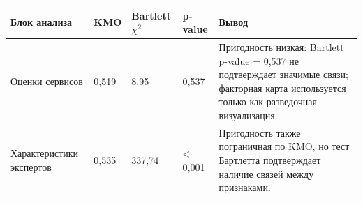 {%
\small
\setlength{\tabcolsep}{3.0pt}
\renewcommand{\arraystretch}{1.15}
\begin{adjustbox}{max width=\textwidth}
\begin{tabular}{L{4.2cm}C{1.7cm}C{2.2cm}C{1.6cm}L{5.2cm}}
\toprule
Блок анализа & KMO & Bartlett $\chi^2$ & p-value & Вывод \\
\midrule
Оценки сервисов & 0,519 & 8,95 & 0,537 & Пригодность низкая: Bartlett p-value = 0,537 не подтверждает значимые связи; факторная карта используется только как разведочная визуализация. \\
Характеристики экспертов & 0,535 & 337,74 & < 0,001 & Пригодность также пограничная по KMO, но тест Бартлетта подтверждает наличие связей между признаками. \\
\bottomrule
\end{tabular}
\end{adjustbox}
}